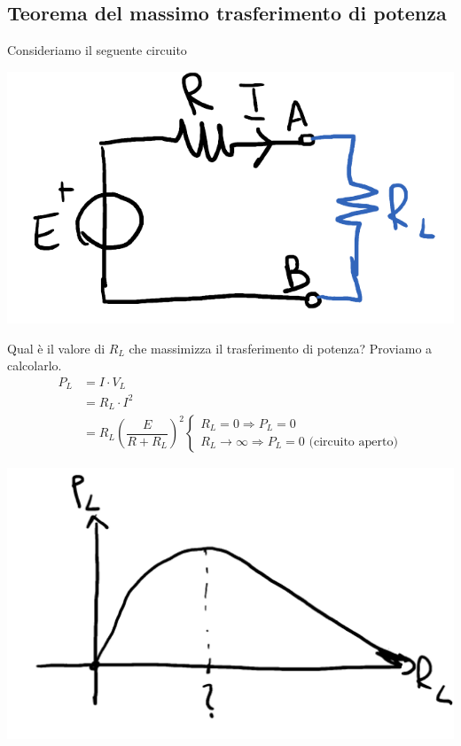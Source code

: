\documentclass{article}
\begin{document}
\subsection{Teorema del massimo trasferimento di potenza}
Consideriamo il seguente circuito
\begin{center}
    \includegraphics[scale=0.3]{Image/T_Massima_Potenza_0.png}
\end{center}
Qual è il valore di $R_L$ che massimizza il trasferimento di potenza? Proviamo a calcolarlo.
\begin{align*}
    P_L &= I \cdot V_L\\
    &=R_L \cdot I^2\\
    &=R_L \left( \dfrac{E}{R+R_L} \right)^2 
    \begin{cases}
        R_L=0 \Rightarrow P_L=0\\
        R_L \rightarrow \infty \Rightarrow P_L=0 \text{ (circuito aperto)}
    \end{cases}
\end{align*}
\begin{center}
    \includegraphics[scale=0.25]{Image/T_Massima_Potenza_1.png}
\end{center}
\end{document}
